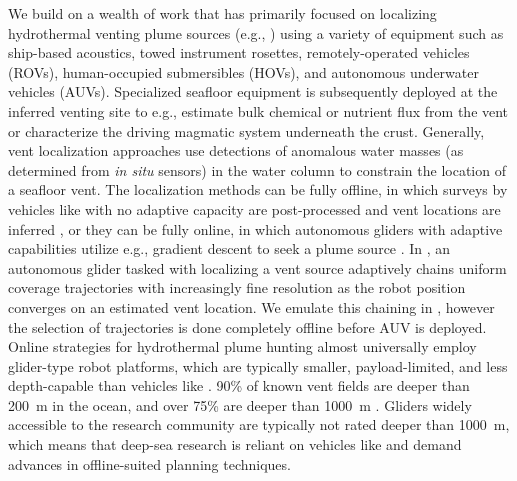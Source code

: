We build on a wealth of work that has primarily focused on localizing hydrothermal venting plume sources (e.g., \autocite{jakuba2007stochastic, mcgill2011robot, nakamura2013discovery, paduan2018discovery, mason2020evaluation, wang20203, kim2020discovery,ferri2010novel}) using a variety of equipment such as ship-based acoustics, towed instrument rosettes, remotely-operated vehicles (ROVs), human-occupied submersibles (HOVs), and autonomous underwater vehicles (AUVs). Specialized seafloor equipment is subsequently deployed at the inferred venting site to e.g., estimate bulk chemical or nutrient flux from the vent or characterize the driving magmatic system underneath the crust. Generally, vent localization approaches use detections of anomalous water masses (as determined from \emph{in situ} sensors) in the water column to constrain the location of a seafloor vent. The localization methods can be fully offline, in which surveys by vehicles like \Sentry with no adaptive capacity are post-processed and vent locations are inferred \autocite{jakuba2007stochastic,nakamura2013discovery}, or they can be fully online, in which autonomous gliders with adaptive capabilities utilize e.g., gradient descent to seek a plume source \autocite{wang20203}. In \autocite{branch2020demonstration}, an autonomous glider tasked with localizing a vent source adaptively chains uniform coverage trajectories with increasingly fine resolution as the robot position converges on an estimated vent location. We emulate this chaining in \PHORTEX, however the selection of trajectories is done completely offline before AUV \Sentry is deployed. Online strategies for hydrothermal plume hunting almost universally employ glider-type robot platforms, which are typically smaller, payload-limited, and less depth-capable than vehicles like \Sentry. 90\% of known vent fields are deeper than \SI{200}{\meter} in the ocean, and over 75\% are deeper than \SI{1000}{\meter} \autocite{beaulieu2013authoritative}. Gliders widely accessible to the research community are typically not rated deeper than \SI{1000}{\meter}, which means that deep-sea research is reliant on vehicles like \Sentry and demand advances in offline-suited planning techniques.

